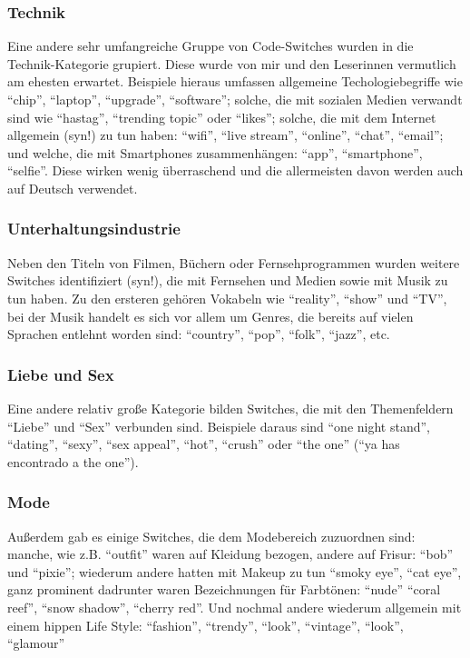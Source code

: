\subsubsection{Technik}
Eine andere sehr umfangreiche Gruppe von Code-Switches wurden in die Technik-Kategorie grupiert.
Diese wurde von mir und den Leserinnen vermutlich am ehesten erwartet.
Beispiele hieraus umfassen allgemeine Techologiebegriffe wie ``chip'', ``laptop'', ``upgrade'', ``software'';
solche, die mit sozialen Medien verwandt sind wie ``hastag'', ``trending topic'' oder ``likes'';
solche, die mit dem Internet allgemein (syn!) zu tun haben: ``wifi'', ``live stream'', ``online'', ``chat'', ``email'';
und welche, die mit Smartphones zusammenhängen: ``app'', ``smartphone'', ``selfie''.
Diese wirken wenig überraschend und die allermeisten davon werden auch auf Deutsch verwendet.


\subsubsection{Unterhaltungsindustrie}
Neben den Titeln von Filmen, Büchern oder Fernsehprogrammen wurden weitere Switches identifiziert (syn!), die mit Fernsehen und Medien sowie mit Musik zu tun haben.
Zu den ersteren gehören Vokabeln wie ``reality'', ``show'' und ``TV'',
bei der Musik handelt es sich vor allem um Genres, die bereits auf vielen Sprachen entlehnt worden sind: ``country'', ``pop'', ``folk'', ``jazz'', etc.

\subsubsection{Liebe und Sex}
Eine andere relativ große Kategorie bilden Switches, die mit den Themenfeldern ``Liebe'' und ``Sex'' verbunden sind.
Beispiele daraus sind ``one night stand'', ``dating'', ``sexy'', ``sex appeal'', ``hot'', ``crush'' oder ``the one'' (``ya has encontrado a the one'').

\subsubsection{Mode}
Außerdem gab es einige Switches, die dem Modebereich zuzuordnen sind:
manche, wie z.B. ``outfit'' waren auf Kleidung bezogen, andere auf Frisur: ``bob'' und ``pixie'';
wiederum andere hatten mit Makeup zu tun ``smoky eye'', ``cat eye'', ganz prominent dadrunter waren Bezeichnungen für Farbtönen: ``nude'' ``coral reef'', ``snow shadow'', ``cherry red''.
Und nochmal andere wiederum allgemein mit einem hippen Life Style:
``fashion'', ``trendy'', ``look'', ``vintage'', ``look'', ``glamour''

